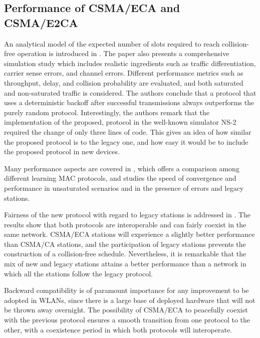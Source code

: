 \documentclass[journal]{IEEEtran}
\begin{document}
\subsection{Performance of CSMA/ECA and CSMA/E2CA}

An analytical model of the expected number of slots required to reach collision-free operation is introduced in \cite{he2009srb}.
The paper also presents a comprehensive simulation study which includes realistic ingredients such as traffic differentiation, carrier sense errors, and channel errors.
Different performance metrics such as throughput, delay, and collision probability are evaluated, and both saturated and non-saturated traffic is considered.
The authors conclude that a protocol that uses a deterministic backoff after successful transmissions always outperforms the purely random protocol.
Interestingly, the authors remark that the implementation of the proposed, protocol in the well-known simulator NS-2 required the change of only three lines of code.
This gives an idea of how similar the proposed protocol is to the legacy one,  and how easy it would be to include the proposed protocol in new devices.

Many performance aspects are covered in \cite{fang2011dlm}, which offers a comparison among different learning MAC protocols, and studies the speed of convergence and performance in unsaturated scenarios and in the presence of errors and legacy stations.

Fairness of the new protocol with regard to legacy stations is addressed in \cite{barcelo2010fcc}.
The results show that both protocols are interoperable and can fairly coexist in the same network.
CSMA/ECA stations will experience a slightly better performance than CSMA/CA stations, and the participation of legacy stations prevents the construction of a collision-free schedule.
Nevertheless, it is remarkable that the mix of new and legacy stations attains a better performance than a network in which all the stations follow the legacy protocol.

Backward compatibility is of paramount importance for any improvement to be adopted in WLANs, since there is a large base of deployed hardware that will not be thrown away overnight.
The possibility of CSMA/ECA to peacefully coexist with the previous protocol ensures a smooth transition from one protocol to the other, with a coexistence period in which both protocols will interoperate.
\end{document}
